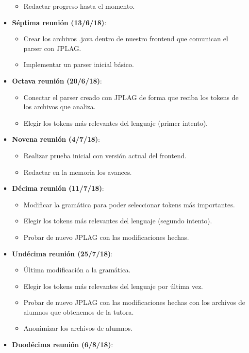\begin{itemize}
\begin{itemize}
	\item Redactar progreso hasta el momento.
	\end{itemize}
	\item \textbf{Séptima reunión (13/6/18)}:
	\begin{itemize}
	\item Crear los archivos .java dentro de nuestro frontend que comunican el parser con JPLAG.
	\item Implementar un parser inicial básico.
	\end{itemize}
	\item \textbf{Octava reunión (20/6/18)}:
	\begin{itemize}
	\item Conectar el parser creado con JPLAG de forma que reciba los tokens de los archivos que analiza.
	\item Elegir los tokens más relevantes del lenguaje (primer intento).
	\end{itemize}
	\item \textbf{Novena reunión (4/7/18)}:
	\begin{itemize}
	\item Realizar prueba inicial con versión actual del frontend.
	\item Redactar en la memoria los avances.
	\end{itemize}
	\item \textbf{Décima reunión (11/7/18)}:
	\begin{itemize}
	\item Modificar la gramática para poder seleccionar tokens más importantes.
	\item Elegir los tokens más relevantes del lenguaje (segundo intento).
	\item Probar de nuevo JPLAG con las modificaciones hechas.
	\end{itemize}
	\item \textbf{Undécima reunión (25/7/18)}:
	\begin{itemize}
	\item Última modificación a la gramática.
	\item Elegir los tokens más relevantes del lenguaje por última vez.
	\item Probar de nuevo JPLAG con las modificaciones hechas con los archivos de alumnos que obtenemos de la tutora.
	\item Anonimizar los archivos de alumnos.
	\end{itemize}
	\item \textbf{Duodécima reunión (6/8/18)}:

\end{itemize}
